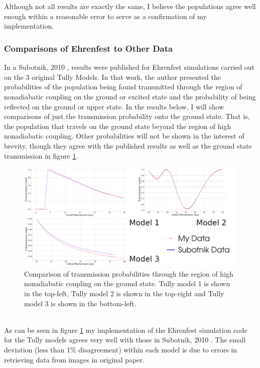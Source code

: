 \\\\
Although not all results are exactly the same, I believe the populations agree well enough within a reasonable error to serve as a confirmation of my implementation.
\subsubsection{Comparisons of Ehrenfest to Other Data}
In a Subotnik, 2010 \cite{SubotnikMomentumEhrenfest}, results were published for Ehrenfest simulations carried out on the 3 original Tully Models. In that work, the author presented the probabilities of the population being found transmitted through the region of nonadiabatic coupling on the ground or excited state and the probability of being reflected on the ground or upper state. In the results below, I will show comparisons of just the transmission probability onto the ground state. That is, the population that travels on the ground state beyond the region of high nonadiabatic coupling. Other probabilities will not be shown in the interest of brevity, though they agree with the published results as well as the ground state transmission in figure \ref{fig:SubotnikComparison}.
\begin{figure}[h]
  \includegraphics[width=\textwidth]{img/CTMQC/TullyModels/Ehrenfest_vs_Subotnik.png}
  \caption{\label{fig:SubotnikComparison}Comparison of transmission probabilities through the region of high nonadiabatic coupling on the ground state. Tully model 1 is shown in the top-left, Tully model 2 is shown in the top-right and Tully model 3 is shown in the bottom-left.}
\end{figure}
\\
As can  be seen in figure \ref{fig:SubotnikComparison} my implementation of the Ehrenfest simulation code for the Tully models agrees very well with those in Subotnik, 2010 \cite{SubotnikMomentumEhrenfest}. The small deviation (less than 1\% disagreement) within each model is due to errors in retrieving data from images in original paper.
